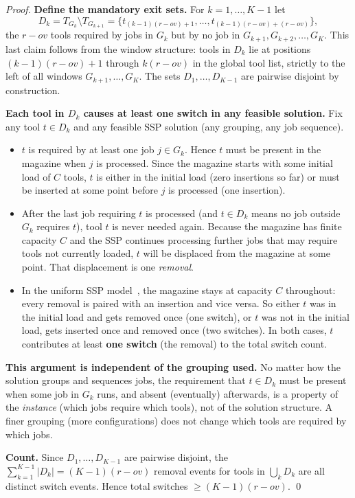 \documentclass[11pt,a4paper]{article}
\theoremstyle{plain}
\theoremstyle{definition}
\begin{document}
\begin{proofbox}
\begin{proof}
\textbf{Define the mandatory exit sets.}
For $k=1,\ldots,K-1$ let
\[
  D_k = T_{G_k}\setminus T_{G_{k+1}}
      = \{t_{(k-1)(r-\mathit{ov})+1},\ldots,t_{(k-1)(r-\mathit{ov})+(r-\mathit{ov})}\},
\]
the $r-\mathit{ov}$ tools required by jobs in $G_k$ but by no job in
$G_{k+1},G_{k+2},\ldots,G_K$.
This last claim follows from the window structure: tools in $D_k$ lie at positions
$(k-1)(r-\mathit{ov})+1$ through $k(r-\mathit{ov})$ in the global tool list,
strictly to the left of all windows $G_{k+1},\ldots,G_K$.
The sets $D_1,\ldots,D_{K-1}$ are pairwise disjoint by construction.

\medskip
\textbf{Each tool in $D_k$ causes at least one switch in any feasible solution.}
Fix any tool $t\in D_k$ and any feasible SSP solution (any grouping, any job sequence).
\begin{itemize}
  \item $t$ is required by at least one job $j\in G_k$. Hence $t$ must be present
        in the magazine when $j$ is processed. Since the magazine starts with some
        initial load of $C$ tools, $t$ is either in the initial load (zero insertions
        so far) or must be inserted at some point before $j$ is processed (one insertion).
  \item After the last job requiring $t$ is processed (and $t\in D_k$ means no job
        outside $G_k$ requires $t$), tool $t$ is never needed again. Because the
        magazine has finite capacity $C$ and the SSP continues processing further jobs
        that may require tools not currently loaded, $t$ will be displaced from the
        magazine at some point. That displacement is one \emph{removal}.
  \item In the uniform SSP model~\cite{TangDenardo1988}, the magazine stays at
        capacity $C$ throughout: every removal is paired with an insertion and vice
        versa. So either $t$ was in the initial load and gets removed once (one switch),
        or $t$ was not in the initial load, gets inserted once and removed once (two
        switches). In both cases, $t$ contributes at least \textbf{one switch}
        (the removal) to the total switch count.
\end{itemize}

\medskip
\textbf{This argument is independent of the grouping used.}
No matter how the solution groups and sequences jobs, the requirement that $t\in D_k$
must be present when some job in $G_k$ runs, and absent (eventually) afterwards,
is a property of the \emph{instance} (which jobs require which tools), not of the
solution structure. A finer grouping (more configurations) does not change which tools
are required by which jobs.

\medskip
\textbf{Count.}
Since $D_1,\ldots,D_{K-1}$ are pairwise disjoint, the $\sum_{k=1}^{K-1}|D_k|
=(K-1)(r-\mathit{ov})$ removal events for tools in $\bigcup_k D_k$ are all distinct
switch events. Hence total switches $\ge (K-1)(r-\mathit{ov})$. \qed
\end{proof}
\end{proofbox}
\end{document}
